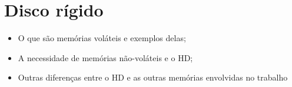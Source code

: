 \chapter{Disco rígido}

    \begin{itemize}
        \item O que são memórias voláteis e exemplos delas;
        \item A necessidade de memórias não-voláteis e o HD;
        \item Outras diferenças entre o HD e as outras memórias 
        envolvidas no trabalho
    \end{itemize}